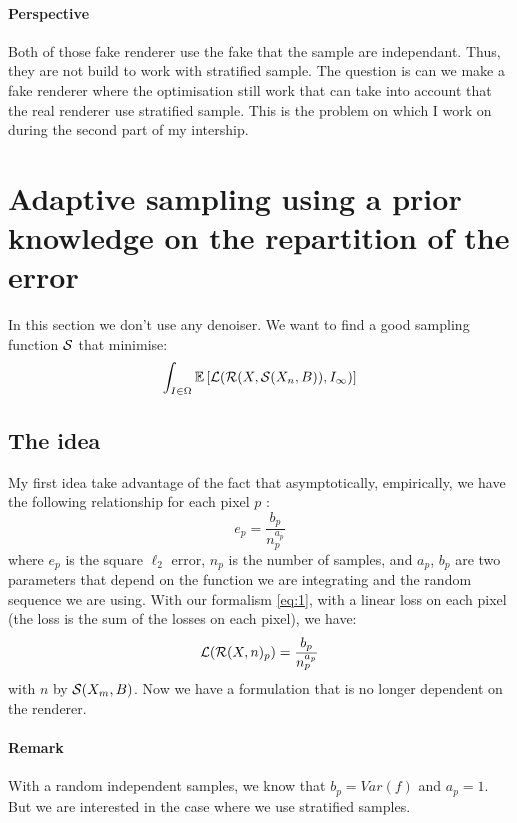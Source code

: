 \documentclass{classeENS}
\begin{document}
\paragraph*{Perspective} Both of those fake renderer use the fake that the sample are
independant. Thus, they are not build to work with stratified sample. The question is
can we make a fake renderer where the optimisation still work that can take into account
that the real renderer use stratified sample. This is the problem on which I work 
on during the second part of my intership.

\section{Adaptive sampling using a prior knowledge on the repartition of the error}

In this section we don't use any denoiser.
We want to find a good sampling function $\mathcal S$ that minimise:
\[ \int_{I\in\Omega} \mathbb E \left [ \mathcal L (\mathcal R(X, \mathcal S(X_n, B)), I_\infty) \right ] \]

\subsection{The idea}

My first idea take advantage of the fact that asymptotically, empirically, we have 
the following relationship for each pixel $p$ \cite{10.1145/237170.237265}:
\begin{equation}
    \label{eq:99}
    e_p = \frac{b_p}{n_p^{a_p}}
\end{equation}
where $e_p$ is the square $\ell_2$ error, $n_p$ is the number of samples, 
and $a_p$, $b_p$ are two parameters that depend on the function we are 
integrating and the random sequence we are using. With our formalism 
\ref{eq:1}, with a linear loss on each pixel (the loss is the sum of 
the losses on each pixel), we have:
\[ \mathcal L(\mathcal R(X,n)_p) = \frac{b_p}{n_p^{a_p}} \]
with $n$ by $\mathcal S(X_m, B)$. Now we have a formulation that is no longer 
dependent on the renderer.

\paragraph*{Remark} With a random independent samples, we know that $b_p = Var(f)$ and 
$a_p=1$. But we are interested in the case where we use stratified samples.
\end{document}
